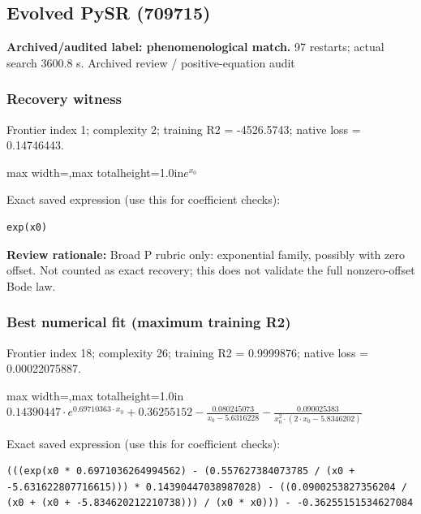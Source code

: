 \documentclass[10pt,letterpaper,landscape]{article}
\begin{document}
\begin{minipage}[t]{0.485\textwidth}
\subsection*{Evolved PySR (709715)}
\textbf{Archived/audited label: phenomenological match.} 97 restarts; actual search 3600.8 s.
{\small Archived review / positive-equation audit}
\subsubsection*{Recovery witness}
Frontier index 1; complexity 2; training R2 = -4526.5743; native loss = 0.14746443.
\begin{center}\begin{adjustbox}{max width=\linewidth,max totalheight=1.0in}$\displaystyle e^{x_{0}}$\end{adjustbox}\end{center}
{\scriptsize Exact saved expression (use this for coefficient checks):}
\begin{lstlisting}
exp(x0)
\end{lstlisting}
{\small\textbf{Review rationale:} Broad P rubric only: exponential family, possibly with zero offset. Not counted as exact recovery; this does not validate the full nonzero-offset Bode law.}
\subsubsection*{Best numerical fit (maximum training R2)}
Frontier index 18; complexity 26; training R2 = 0.9999876; native loss = 0.00022075887.
\begin{center}\begin{adjustbox}{max width=\linewidth,max totalheight=1.0in}$\displaystyle 0.14390447 \cdot e^{0.69710363 \cdot x_{0}} + 0.36255152 - \frac{0.080245073}{x_{0} - 5.6316228} - \frac{0.090025383}{x_{0}^{2} \cdot \left(2 \cdot x_{0} - 5.8346202\right)}$\end{adjustbox}\end{center}
{\scriptsize Exact saved expression (use this for coefficient checks):}
\begin{lstlisting}
(((exp(x0 * 0.6971036264994562) - (0.557627384073785 / (x0 + -5.631622807716615))) * 0.14390447038987028) - ((0.0900253827356204 / (x0 + (x0 + -5.834620212210738))) / (x0 * x0))) - -0.36255151534627084
\end{lstlisting}
\end{minipage}
\clearpage{}\label{bode-10005}
\end{document}
